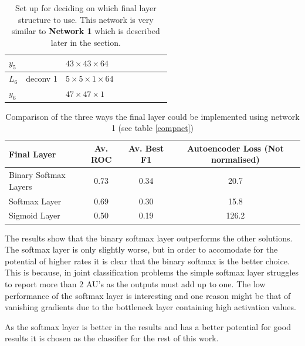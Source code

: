 \begin{table}[h!]
{\begin{tabular}{|lllllllll|}
    \multicolumn{1}{|l|}{$y_5$}   &          & \multicolumn{1}{l|}{$43\times43\times 64$}          &          & \multicolumn{1}{l|}{}          \\ \hline
    \multicolumn{1}{|l|}{$L_6$}   & deconv 1   & \multicolumn{1}{l|}{$5\times 5\times1\times 64$}  &          & \multicolumn{1}{l|}{}\\
    \multicolumn{1}{|l|}{$y_6$}   &          & \multicolumn{1}{l|}{$47\times47\times1$}            &          & \multicolumn{1}{l|}{}         \\ \hline
    \end{tabular}

    \caption{Set up for deciding on which final layer structure to use.
    This network is very similar to \textbf{Network 1} which is described later in the section.} \label{net:classcompnet}

    }
    \end{table}


    \begin{table}[!h] {\small
      \centering
      \begin{tabular}{lccc}
      \hline
      Final Layer   & Av. ROC &   Av. Best F1 &   Autoencoder Loss (Not normalised) \\
      \hline
      Binary Softmax Layers  &   0.73 &  0.34 &   20.7 \\
      Softmax Layer          &   0.69 &  0.30 &   15.8 \\
      Sigmoid Layer          &   0.50 &  0.19 &  126.2 \\
      \hline
      \end{tabular}
    \caption{Comparison of the three ways the final layer could be implemented using network 1 (see table \ref{compnet})} \label{net:classcompnet} }
    \end{table}

    The results show that the binary softmax layer outperforms the other solutions. The
    softmax layer is only slightly worse, but in order to accomodate for the potential of higher rates
    it is clear that the binary softmax is the better choice. This is because, in joint classification problems
    the simple softmax layer struggles to report more than 2 AU's as the outputs must add up to one.
    The low performance of the softmax layer is interesting and one reason might be that of vanishing gradients due to
    the bottleneck layer containing high activation values.

    As the softmax layer is better in the results and has a better potential for good results
    it is chosen as the classifier for the rest of this work.

